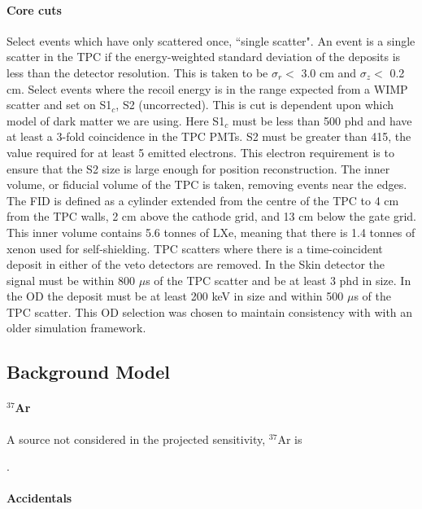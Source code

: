 \paragraph{Core cuts}
Select events which have only scattered once, ``single scatter". An event is a single scatter in the TPC if the energy-weighted standard deviation of the deposits is less than the detector resolution. This is taken to be $\sigma_r <$ 3.0 cm and $\sigma_z <$ 0.2 cm.
Select events where the recoil energy is in the range expected from a WIMP scatter and set on S1$_c$, S2 (uncorrected). This is cut is dependent upon which model of dark matter we are using. Here S1$_c$ must be less than 500 phd and have at least a 3-fold coincidence in the TPC PMTs. S2 must be greater than 415, the value required for at least 5 emitted electrons. This electron requirement is to ensure that the S2 size is large enough for position reconstruction.
The inner volume, or fiducial volume of the TPC is taken, removing events near the edges. The FID is defined as a cylinder extended from the centre of the TPC to 4 cm from the TPC walls, 2 cm above the cathode grid, and 13 cm below the gate grid. This inner volume contains 5.6 tonnes of LXe, meaning that there is 1.4 tonnes of xenon used for self-shielding.
TPC scatters where there is a time-coincident deposit in either of the veto detectors are removed. In the Skin detector the signal must be within 800 $\mu$s of the TPC scatter and be at least 3 phd in size. In the OD the deposit must be at least 200 keV in size and within 500 $\mu$s of the TPC scatter. This OD selection was chosen to maintain consistency with \cite{LZ_projected_sensitivity_paper_ref} with an older simulation framework.



\subsection{Background Model}
\par



\paragraph{${}^{37}$Ar}
A source not considered in the projected sensitivity, ${}^{37}$Ar is 

\cite{lz_argon37_ref}.

\paragraph{Accidentals}





